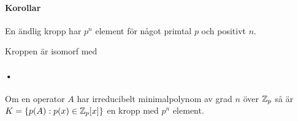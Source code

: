 \proof

\paragraph{Korollar}
En ändlig kropp har $p^{n}$ element för något primtal $p$ och positivt $n$.

\proof
Kroppen är isomorf med 

\paragraph{•}
Om en operator $A$ har irreducibelt minimalpolynom av grad $n$ över $\mathbb{Z}_{p}$ så är $K = \{p(A): p(x)\in\mathbb{Z}_{p}[x]\}$ en kropp med $p^{n}$ element.

\proof